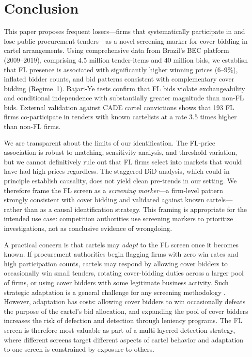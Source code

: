 \section{Conclusion}
\label{sec:conclusion}

This paper proposes frequent losers---firms that systematically participate in and lose public procurement tenders---as a novel screening marker for cover bidding in cartel arrangements. Using comprehensive data from Brazil's BEC platform (2009--2019), comprising 4.5 million tender-items and 40 million bids, we establish that FL presence is associated with significantly higher winning prices (6--9\%), inflated bidder counts, and bid patterns consistent with complementary cover bidding (Regime~1). Bajari-Ye tests confirm that FL bids violate exchangeability and conditional independence with substantially greater magnitude than non-FL bids. External validation against CADE cartel convictions shows that 193 FL firms co-participate in tenders with known cartelists at a rate 3.5 times higher than non-FL firms.

We are transparent about the limits of our identification. The FL-price association is robust to matching, sensitivity analysis, and threshold variation, but we cannot definitively rule out that FL firms select into markets that would have had high prices regardless. The staggered DiD analysis, which could in principle establish causality, does not yield clean pre-trends in our setting. We therefore frame the FL screen as a \textit{screening marker}---a firm-level pattern strongly consistent with cover bidding and validated against known cartels---rather than as a causal identification strategy. This framing is appropriate for the intended use case: competition authorities use screening markers to prioritize investigations, not as conclusive evidence of wrongdoing.

A practical concern is that cartels may \textit{adapt} to the FL screen once it becomes known. If procurement authorities begin flagging firms with zero win rates and high participation counts, cartels may respond by allowing cover bidders to occasionally win small tenders, rotating cover-bidding duties across a larger pool of firms, or using cover bidders with some legitimate business activity. Such strategic adaptation is a general challenge for any screening methodology \citep{harrington2008detecting}. However, adaptation has costs: allowing cover bidders to win occasionally defeats the purpose of the cartel's bid allocation, and expanding the pool of cover bidders increases the risk of defection and detection through leniency programs. The FL screen is therefore most valuable as part of a multi-layered detection strategy, where different screens target different aspects of cartel behavior and adaptation to one screen is constrained by exposure to others.

